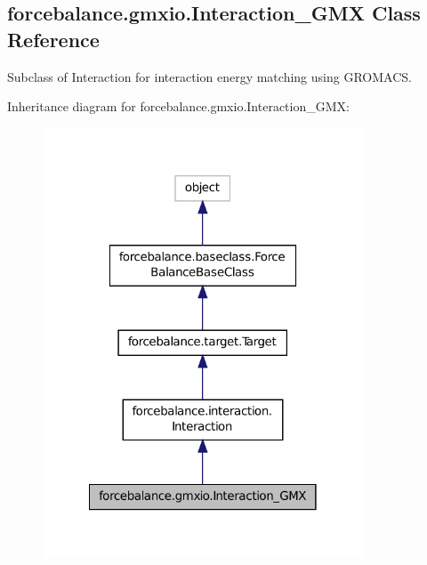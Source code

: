 \hypertarget{classforcebalance_1_1gmxio_1_1Interaction__GMX}{\subsection{forcebalance.\-gmxio.\-Interaction\-\_\-\-G\-M\-X Class Reference}
\label{classforcebalance_1_1gmxio_1_1Interaction__GMX}
}


Subclass of Interaction for interaction energy matching using G\-R\-O\-M\-A\-C\-S.  




Inheritance diagram for forcebalance.\-gmxio.\-Interaction\-\_\-\-G\-M\-X\-:\nopagebreak
\begin{figure}[H]
\begin{center}
\leavevmode
\includegraphics[width=270pt]{classforcebalance_1_1gmxio_1_1Interaction__GMX__inherit__graph}
\end{center}
\end{figure}


